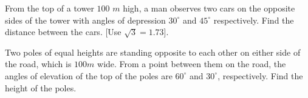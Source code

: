     \item From the top of a tower $100$ $m$ high, a man observes two cars on the opposite sides of the tower with angles of depression $30^\circ$ and $45^\circ$ respectively. Find the distance between the cars. [Use $\sqrt{3}=1.73$].
    \item Two poles of equal heights are standing opposite to each other on either side of the road, which is $100m$ wide. From a point between them on the road, the angles of elevation of the top of the poles are $60^\circ$ and $30^\circ$, respectively. Find the height of the poles.

